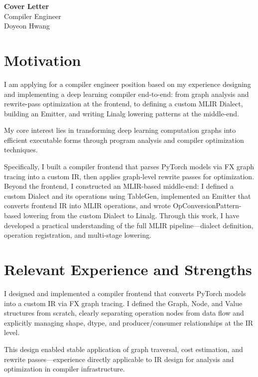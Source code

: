 \documentclass[a4paper,12pt]{article}
\begin{document}
\begin{center}
{\Large \textbf{Cover Letter}}\\[0.5cm]
{\large Compiler Engineer}\\[0.3cm]
Doyeon Hwang
\end{center}

\vspace{1cm}

\section{Motivation}

I am applying for a compiler engineer position
based on my experience designing and implementing
a deep learning compiler end-to-end:
from graph analysis and rewrite-pass optimization at the frontend,
to defining a custom MLIR Dialect, building an Emitter,
and writing Linalg lowering patterns at the middle-end.

My core interest lies in transforming deep learning computation graphs
into efficient executable forms
through program analysis and compiler optimization techniques.

Specifically, I built a compiler frontend that parses PyTorch models
via FX graph tracing into a custom IR,
then applies graph-level rewrite passes for optimization.
Beyond the frontend, I constructed an MLIR-based middle-end:
I defined a custom Dialect and its operations using TableGen,
implemented an Emitter that converts frontend IR into MLIR operations,
and wrote OpConversionPattern-based lowering from the custom Dialect to Linalg.
Through this work, I have developed a practical understanding
of the full MLIR pipeline---dialect definition, operation registration,
and multi-stage lowering.

\section{Relevant Experience and Strengths}

I designed and implemented a compiler frontend
that converts PyTorch models into a custom IR via FX graph tracing.
I defined the Graph, Node, and Value structures from scratch,
clearly separating operation nodes from data flow
and explicitly managing shape, dtype, and producer/consumer relationships
at the IR level.

This design enabled stable application of graph traversal,
cost estimation, and rewrite passes---experience
directly applicable to IR design for analysis and optimization
in compiler infrastructure.
\end{document}
